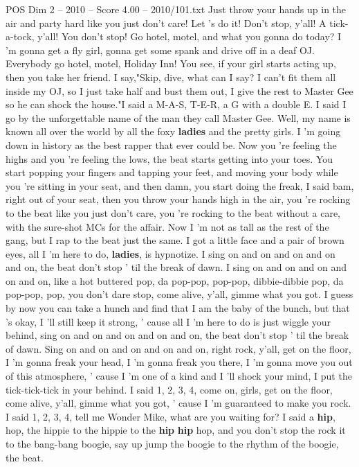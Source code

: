 \begin{textsample}{POS Dim 2 – 2010 – Score 4.00 – 2010/101.txt}
Just throw your hands up in the air and party hard like you just don't care!
Let 's do it!
Don't stop, y'all!
A tick-a-tock, y'all!
You don't stop!
Go hotel, motel, and what you gonna do today?
I 'm gonna get a fly girl, gonna get some spank and drive off in a deaf OJ.
Everybody go hotel, motel, Holiday Inn!
You see, if your girl starts acting up, then you take her friend.
I say,"Skip, dive, what can I say?
I can't fit them all inside my OJ, so I just take half and bust them out, I give the rest to Master Gee so he can shock the house."I said a M-A-S, T-E-R, a G with a double E.
I said I go by the unforgettable name of the man they call Master Gee.
Well, my name is known all over the world by all the foxy \textbf{ladies} and the pretty girls.
I 'm going down in history as the best rapper that ever could be.
Now you 're feeling the highs and you 're feeling the lows, the beat starts getting into your toes.
You start popping your fingers and tapping your feet, and moving your body while you 're sitting in your seat, and then damn, you start doing the freak, I said bam, right out of your seat, then you throw your hands high in the air, you 're rocking to the beat like you just don't care, you 're rocking to the beat without a care, with the sure-shot MCs for the affair.
Now I 'm not as tall as the rest of the gang, but I rap to the beat just the same.
I got a little face and a pair of brown eyes, all I 'm here to do, \textbf{ladies}, is hypnotize.
I sing on and on and on and on and on, the beat don't stop ' til the break of dawn.
I sing on and on and on and on and on, like a hot buttered pop, da pop-pop, pop-pop, dibbie-dibbie pop, da pop-pop, pop, you don't dare stop, come alive, y'all, gimme what you got.
I guess by now you can take a hunch and find that I am the baby of the bunch, but that 's okay, I 'll still keep it strong, ' cause all I 'm here to do is just wiggle your behind, sing on and on and on and on and on, the beat don't stop ' til the break of dawn.
Sing on and on and on and on and on, right rock, y'all, get on the floor, I 'm gonna freak your head, I 'm gonna freak you there, I 'm gonna move you out of this atmosphere, ' cause I 'm one of a kind and I 'll shock your mind, I put the tick-tick-tick in your behind.
I said 1, 2, 3, 4, come on, girls, get on the floor, come alive, y'all, gimme what you got, ' cause I 'm guaranteed to make you rock.
I said 1, 2, 3, 4, tell me Wonder Mike, what are you waiting for?
I said a \textbf{hip}, hop, the hippie to the hippie to the \textbf{hip} \textbf{hip} hop, and you don't stop the rock it to the bang-bang boogie, say up jump the boogie to the rhythm of the boogie, the beat.

\end{textsample}
